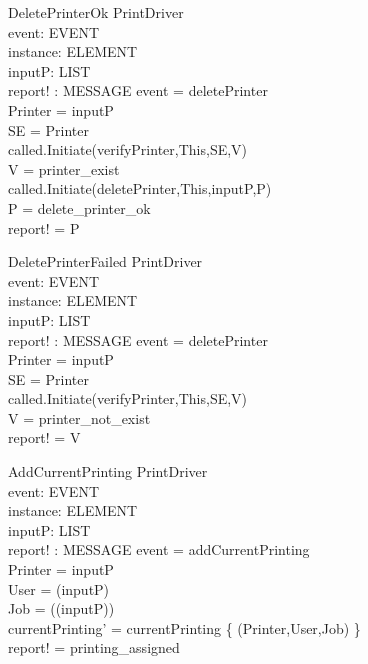 \begin{schema}{DeletePrinterOk}
\Delta PrintDriver \\
event: EVENT \\
instance: ELEMENT \\
inputP: LIST \\
report! : MESSAGE
\where event = deletePrinter \\
Printer = \head inputP \\
SE = \lseq Printer \rseq \\
called.Initiate(verifyPrinter,This,SE,V) \\
V = printer\_exist \\
called.Initiate(deletePrinter,This,inputP,P) \\
P = delete\_printer\_ok \\
report! = P
\end{schema}

\begin{schema}{DeletePrinterFailed}
\Delta PrintDriver \\
event: EVENT \\
instance: ELEMENT \\
inputP: LIST \\
report! : MESSAGE
\where event = deletePrinter \\
Printer = \head inputP \\
SE = \lseq Printer \rseq \\
called.Initiate(verifyPrinter,This,SE,V) \\
V = printer\_not\_exist \\
report! = V
\end{schema}

\begin{schema}{AddCurrentPrinting}
\Delta PrintDriver \\
event: EVENT \\
instance: ELEMENT \\
inputP: LIST \\
report! : MESSAGE
\where event = addCurrentPrinting \\
Printer = \head inputP \\
User = \head (\tail inputP) \\
Job = \head (\tail (\tail inputP)) \\
currentPrinting' = currentPrinting \uni \{ (Printer,User,Job) \} \\
report! = printing\_assigned
\end{schema}

